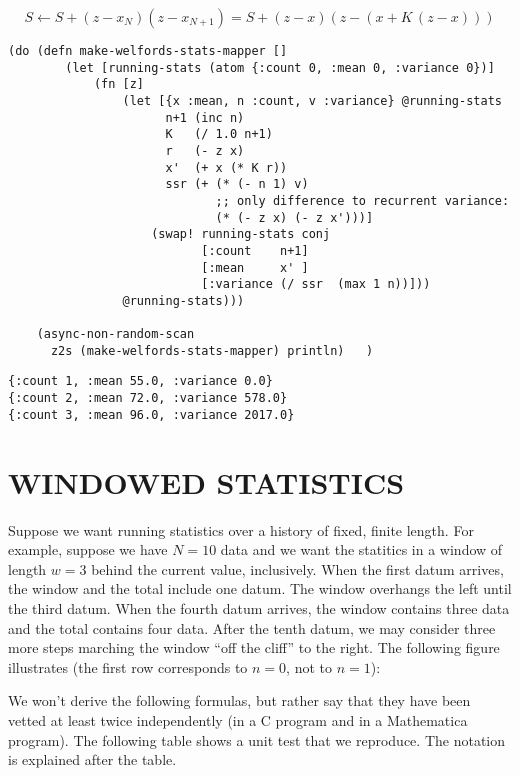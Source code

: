 \documentclass[10pt,oneside,x11names]{article}
\begin{document}
$$S\leftarrow{S} + \left(z-x_N\right)\left(z-x_{N+1}\right)=S+\left(z-x\right)\left(z-\left(x+K\,\left(z-x\right)\right)\right)$$

\begin{verbatim}
(do (defn make-welfords-stats-mapper []
        (let [running-stats (atom {:count 0, :mean 0, :variance 0})]
            (fn [z]
                (let [{x :mean, n :count, v :variance} @running-stats
                      n+1 (inc n)
                      K   (/ 1.0 n+1)
                      r   (- z x)
                      x'  (+ x (* K r))
                      ssr (+ (* (- n 1) v)
                             ;; only difference to recurrent variance:
                             (* (- z x) (- z x')))]
                    (swap! running-stats conj
                           [:count    n+1]
                           [:mean     x' ]
                           [:variance (/ ssr  (max 1 n))]))
                @running-stats)))

    (async-non-random-scan
      z2s (make-welfords-stats-mapper) println)   )
\end{verbatim}

\begin{verbatim}
{:count 1, :mean 55.0, :variance 0.0}
{:count 2, :mean 72.0, :variance 578.0}
{:count 3, :mean 96.0, :variance 2017.0}
\end{verbatim}

\section{WINDOWED STATISTICS}
\label{windowed-statistics}
Suppose we want running statistics over a history of fixed, finite
length. For example, suppose we have \(N=10\) data and we want the
statitics in a window of length \(w=3\) behind the current value,
inclusively. When the first datum arrives, the window and the total
include one datum. The window overhangs the left until the third datum.
When the fourth datum arrives, the window contains three data and the
total contains four data. After the tenth datum, we may consider three
more steps marching the window ``off the cliff'' to the right. The
following figure illustrates (the first row corresponds to \(n=0\), not to
\(n=1\)):

We won't derive the following formulas, but rather say that they have
been vetted at least twice independently (in a C program and in a
Mathematica program). The following table shows a unit test that we
reproduce. The notation is explained after the table.
\end{document}

